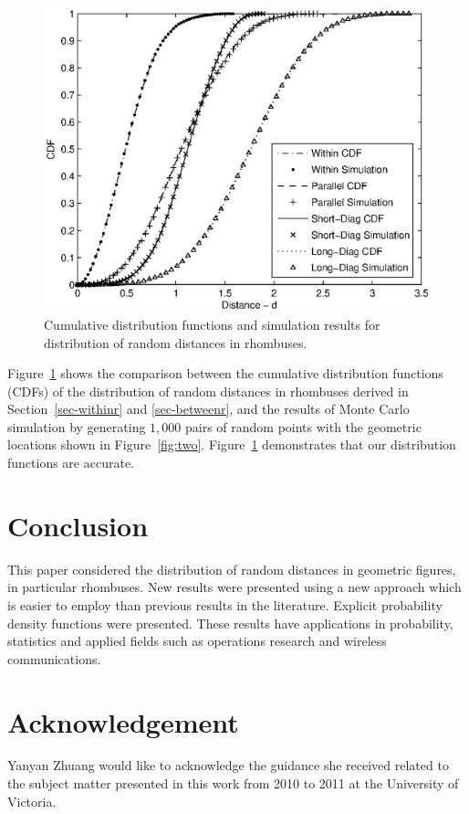 \documentclass[12pt,draftclsnofoot,onecolumn]{IEEEtran}
\begin{document}
\begin{figure}
  \centering
  \includegraphics[width=0.6\columnwidth]{fig/rhombus_cdf}
  \caption{Cumulative distribution functions and simulation results for 
  distribution of random distances in rhombuses.}
  \label{fig:cdf}
\end{figure}

Figure~\ref{fig:cdf} shows the comparison between the cumulative 
distribution functions (CDFs) of the distribution of random distances
in rhombuses derived in Section~\ref{sec-withinr} and \ref{sec-betweenr}, 
and the results of Monte Carlo simulation by 
generating $1,000$ pairs of random points with the geometric 
locations shown in Figure~\ref{fig:two}. Figure~\ref{fig:cdf} 
demonstrates that our distribution functions are accurate.

\section{Conclusion}
This paper considered the distribution of random distances in geometric figures,
in particular rhombuses.
New results were presented using a new approach which is easier to
employ than previous results in the literature.
Explicit probability density functions were presented.
These results have applications in probability, statistics and applied fields
such as operations research and wireless communications.

\section*{Acknowledgement}
Yanyan Zhuang would like to acknowledge the guidance she received related to the
subject matter presented in this work from 2010 to 2011 at the University of
Victoria.



\end{document}
